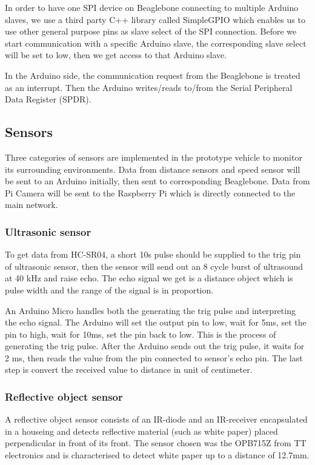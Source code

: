 \documentclass[11pt, titlepage]{article} %
\begin{document}
In order to have one SPI device on Beaglebone connecting to multiple Arduino slaves, we use a third party C++ library called SimpleGPIO which enables us to use other general purpose pins as slave select of the SPI connection. Before we start communication with a specific Arduino slave, the corresponding slave select will be set to low, then we get access to that Arduino slave.

In the Arduino side, the communication request from the Beaglebone is treated as an interrupt. Then the Arduino writes/reads to/from the Serial Peripheral Data Register (SPDR). 
\subsection{Sensors}
Three categories of sensors are implemented in the prototype vehicle to monitor its surrounding environments. Data from distance sensors and speed sensor will be sent to an Arduino initially, then sent to corresponding Beaglebone. Data from Pi Camera will be sent to the Raspberry Pi which is directly connected to the main network.
\subsubsection{Ultrasonic sensor}
To get data from HC-SR04, a short 10\textmu s pulse should be supplied to the trig pin of ultrasonic sensor, then the sensor will send out an 8 cycle burst of ultrasound at 40 kHz and raise echo. The echo signal we get is a distance object which is pulse width and the range of the signal is in proportion. 

An Arduino Micro handles both the generating the trig pulse and interpreting the echo signal. The Arduino will set the output pin to low, wait for 5ms, set the pin to high, wait for 10ms, set the pin back to low. This is the process of generating the trig pulse. After the Arduino sends out the trig pulse, it waits for 2 ms, then reads the value from the pin connected to sensor's echo pin. The last step is convert the received value to distance in unit of centimeter.


\subsubsection{Reflective object sensor}
A reflective object sensor consists of an IR-diode and an IR-receiver encapsulated in a houseing and detects reflective material (such as white paper) placed perpendicular in front of its front. The sensor chosen was the OPB715Z from TT electronics and is characterised to detect white paper up to a distance of 12.7mm.
\end{document}
